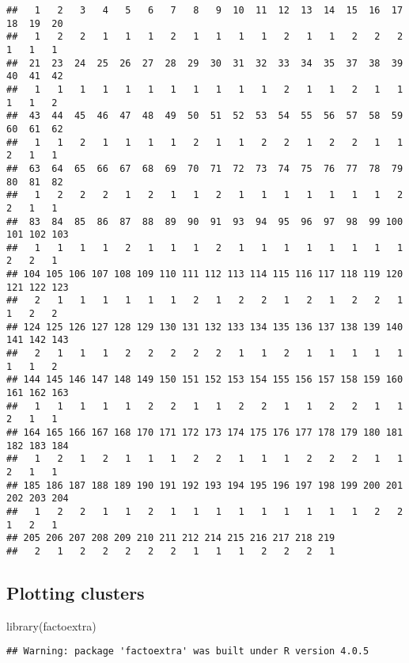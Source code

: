 \documentclass[
]{article}
\newenvironment{Shaded}{\begin{snugshade}}{\end{snugshade}}
\newcommand{\FunctionTok}[1]{\textcolor[rgb]{0.00,0.00,0.00}{#1}}
\newcommand{\NormalTok}[1]{#1}
\begin{document}
\begin{verbatim}
##   1   2   3   4   5   6   7   8   9  10  11  12  13  14  15  16  17  18  19  20 
##   1   2   2   1   1   1   2   1   1   1   1   2   1   1   2   2   2   1   1   1 
##  21  23  24  25  26  27  28  29  30  31  32  33  34  35  37  38  39  40  41  42 
##   1   1   1   1   1   1   1   1   1   1   1   2   1   1   2   1   1   1   1   2 
##  43  44  45  46  47  48  49  50  51  52  53  54  55  56  57  58  59  60  61  62 
##   1   1   2   1   1   1   1   2   1   1   2   2   1   2   2   1   1   2   1   1 
##  63  64  65  66  67  68  69  70  71  72  73  74  75  76  77  78  79  80  81  82 
##   1   2   2   2   1   2   1   1   2   1   1   1   1   1   1   1   2   2   1   1 
##  83  84  85  86  87  88  89  90  91  93  94  95  96  97  98  99 100 101 102 103 
##   1   1   1   1   2   1   1   1   2   1   1   1   1   1   1   1   1   2   2   1 
## 104 105 106 107 108 109 110 111 112 113 114 115 116 117 118 119 120 121 122 123 
##   2   1   1   1   1   1   1   2   1   2   2   1   2   1   2   2   1   1   2   2 
## 124 125 126 127 128 129 130 131 132 133 134 135 136 137 138 139 140 141 142 143 
##   2   1   1   1   2   2   2   2   2   1   1   2   1   1   1   1   1   1   1   2 
## 144 145 146 147 148 149 150 151 152 153 154 155 156 157 158 159 160 161 162 163 
##   1   1   1   1   1   2   2   1   1   2   2   1   1   2   2   1   1   2   1   1 
## 164 165 166 167 168 170 171 172 173 174 175 176 177 178 179 180 181 182 183 184 
##   1   2   1   2   1   1   1   2   2   1   1   1   2   2   2   1   1   2   1   1 
## 185 186 187 188 189 190 191 192 193 194 195 196 197 198 199 200 201 202 203 204 
##   1   2   2   1   1   2   1   1   1   1   1   1   1   1   1   2   2   1   2   1 
## 205 206 207 208 209 210 211 212 214 215 216 217 218 219 
##   2   1   2   2   2   2   2   1   1   1   2   2   2   1
\end{verbatim}

\hypertarget{plotting-clusters}{%
\subsection{Plotting clusters}\label{plotting-clusters}}

\begin{Shaded}
\begin{Highlighting}[]
\FunctionTok{library}\NormalTok{(factoextra)}
\end{Highlighting}
\end{Shaded}

\begin{verbatim}
## Warning: package 'factoextra' was built under R version 4.0.5
\end{verbatim}
\end{document}
